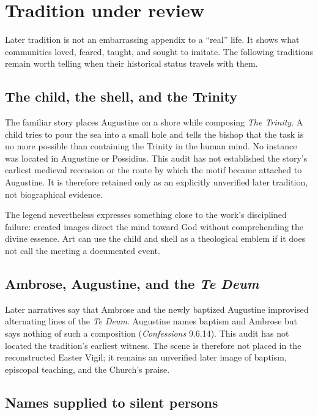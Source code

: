\section{Tradition under review}\label{sec:aug-tradition}

Later tradition is not an embarrassing appendix to a “real” life. It shows
what communities loved, feared, taught, and sought to imitate. The following
traditions remain worth telling when their historical status travels with
them.

\subsection{The child, the shell, and the Trinity}

The familiar story places Augustine on a shore while composing
\emph{The Trinity}. A child tries to pour the sea into a small hole and tells
the bishop that the task is no more possible than containing the Trinity in
the human mind. No instance was located in Augustine or Possidius. This audit
has not established the story's earliest medieval recension or the route by
which the motif became attached to Augustine. It is therefore retained only as
an explicitly unverified later tradition, not biographical evidence.

The legend nevertheless expresses something close to the work's disciplined
failure: created images direct the mind toward God without comprehending the
divine essence. Art can use the child and shell as a theological emblem if it
does not call the meeting a documented event.

\subsection{Ambrose, Augustine, and the \emph{Te Deum}}

Later narratives say that Ambrose and the newly baptized Augustine improvised
alternating lines of the \emph{Te Deum}. Augustine names baptism and Ambrose
but says nothing of such a composition (\emph{Confessions} 9.6.14). This audit
has not located the tradition's earliest witness. The scene is therefore not
placed in the reconstructed Easter Vigil; it remains an unverified later image
of baptism, episcopal teaching, and the Church's praise.

\subsection{Names supplied to silent persons}


